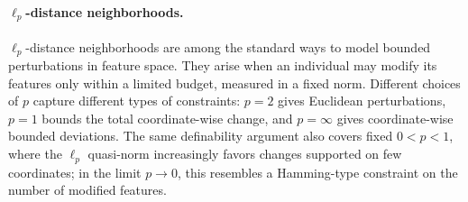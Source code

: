 \documentclass[11pt]{article}
\theoremstyle{plain}
\theoremstyle{definition}
\theoremstyle{remark}
\newtheorem{remark}[theorem]{Remark}
\newcommand{\R}{\mathbb{R}}
\begin{document}


\paragraph{\(\ell_p\)-distance neighborhoods.}

\(\ell_p\)-distance neighborhoods are among the standard ways to model bounded
perturbations in feature space. They arise when an individual may modify its
features only within a limited budget, measured in a fixed norm. Different
choices of \(p\) capture different types of constraints: \(p=2\) gives
Euclidean perturbations, \(p=1\) bounds the total coordinate-wise change, and
\(p=\infty\) gives coordinate-wise bounded deviations. The same definability
argument also covers fixed \(0<p<1\), where the \(\ell_p\) quasi-norm
increasingly favors changes supported on few coordinates; in the limit
\(p\to 0\), this resembles a Hamming-type constraint on the number of modified
features.
\end{document}
